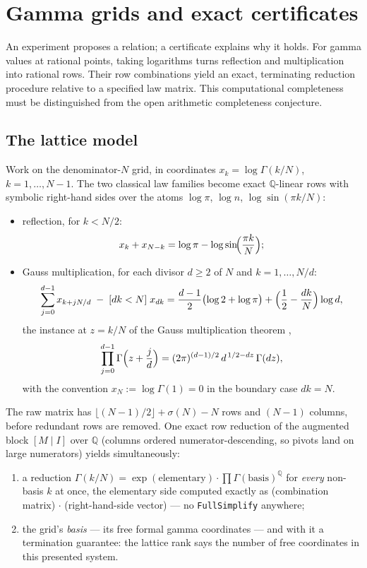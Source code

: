 \chapter{Gamma grids and exact certificates}
\label{ch:05-gamma}

An experiment proposes a relation; a certificate explains why it holds.
For gamma values at rational points, taking logarithms turns reflection and
multiplication into rational rows. Their row combinations yield an exact,
terminating reduction procedure relative to a specified law matrix. This
computational completeness must be distinguished from the open arithmetic
completeness conjecture.

\section{The lattice model}\label{gamma:sec:lattice}

Work on the denominator-$N$ grid, in coordinates $x_k=\log\Gamma(k/N)$, $k=1,\dots,N-1$.
The two classical law families become exact $\mathbb{Q}$-linear rows with symbolic
right-hand sides over the atoms $\log\pi$, $\log n$, $\log\sin(\pi k/N)$:
\begin{itemize}
\item reflection, for $k<N/2$:
\[
x_k+x_{N-k}=\log\pi-\log\sin\!\Bigl(\frac{\pi k}{N}\Bigr);
\]
\item Gauss multiplication, for each divisor $d\ge2$ of $N$ and $k=1,\dots,N/d$:
\[
\sum_{j=0}^{d-1}x_{k+jN/d}\;-\;[dk<N]\;x_{dk}
=\frac{d-1}{2}\bigl(\log2+\log\pi\bigr)+\Bigl(\frac12-\frac{dk}{N}\Bigr)\log d ,
\]
the instance at $z=k/N$ of the Gauss multiplication theorem \cite{gamma:Gauss},
\[
\prod_{j=0}^{d-1}\Gamma\Bigl(z+\frac{j}{d}\Bigr)=(2\pi)^{(d-1)/2}\,d^{\,1/2-dz}\,\Gamma(dz),
\]
with the convention $x_N:=\log\Gamma(1)=0$ in the boundary case $dk=N$.
\end{itemize}
The raw matrix has $\lfloor(N-1)/2\rfloor+\sigma(N)-N$ rows and
$(N-1)$ columns, before redundant rows are removed. One exact row reduction of the
augmented block $[M\mid I]$ over $\mathbb{Q}$ (columns ordered numerator-descending, so
pivots land on large numerators) yields simultaneously:
\begin{enumerate}
\item a reduction $\Gamma(k/N)=\exp(\text{elementary})\cdot\prod\Gamma(\text{basis})^{\mathbb{Q}}$
for \emph{every} non-basis $k$ at once, the elementary side computed exactly as
(combination matrix)$\,\cdot\,$(right-hand-side vector) --- no \texttt{FullSimplify}
anywhere;
\item the grid's \emph{basis} --- its free formal gamma coordinates --- and with it a
termination guarantee: the lattice rank says the number of free coordinates in this presented system.
\end{enumerate}

